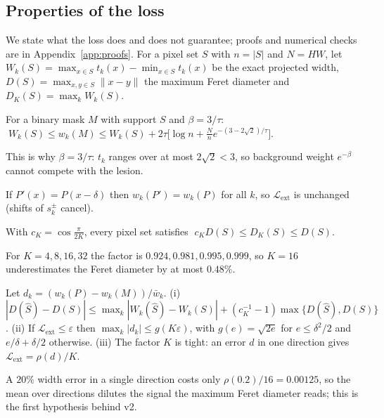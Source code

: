 \subsection{Properties of the loss}\label{sec:theory}
We state what the loss does and does not guarantee; proofs and numerical checks are in Appendix~\ref{app:proofs}. For a pixel set $S$ with $n=|S|$ and $N=HW$, let $W_k(S)=\max_{x\in S}t_k(x)-\min_{x\in S}t_k(x)$ be the exact projected width, $D(S)=\max_{x,y\in S}\|x-y\|$ the maximum Feret diameter and $D_K(S)=\max_kW_k(S)$.

\begin{proposition}\label{prop:support}
For a binary mask $M$ with support $S$ and $\beta=3/\tau$: $\;W_k(S)\le w_k(M)\le W_k(S)+2\tau\big[\log n+\tfrac{N}{n}e^{-(3-2\sqrt2)/\tau}\big]$.
\end{proposition}
This is why $\beta=3/\tau$: $t_k$ ranges over at most $2\sqrt2<3$, so background weight $e^{-\beta}$ cannot compete with the lesion.

\begin{proposition}\label{prop:translation}
If $P'(x)=P(x-\delta)$ then $w_k(P')=w_k(P)$ for all $k$, so $\mathcal{L}_{\mathrm{ext}}$ is unchanged (shifts of $s_k^{\pm}$ cancel).
\end{proposition}

\begin{proposition}\label{prop:K}
With $c_K=\cos\frac{\pi}{2K}$, every pixel set satisfies $\;c_KD(S)\le D_K(S)\le D(S)$.
\end{proposition}
For $K=4,8,16,32$ the factor is $0.924,0.981,0.995,0.999$, so $K=16$ underestimates the Feret diameter by at most $0.48\%$.

\begin{proposition}\label{prop:dilution}
Let $d_k=(w_k(P)-w_k(M))/\bar w_k$. (i) $|D(\hat S)-D(S)|\le\max_k|W_k(\hat S)-W_k(S)|+(c_K^{-1}-1)\max\{D(\hat S),D(S)\}$. (ii) If $\mathcal{L}_{\mathrm{ext}}\le\varepsilon$ then $\max_k|d_k|\le g(K\varepsilon)$, with $g(e)=\sqrt{2e}$ for $e\le\delta^2/2$ and $e/\delta+\delta/2$ otherwise. (iii) The factor $K$ is tight: an error $d$ in one direction gives $\mathcal{L}_{\mathrm{ext}}=\rho(d)/K$.
\end{proposition}
A $20\%$ width error in a single direction costs only $\rho(0.2)/16=0.00125$, so the mean over directions dilutes the signal the maximum Feret diameter reads; this is the first hypothesis behind v2.

